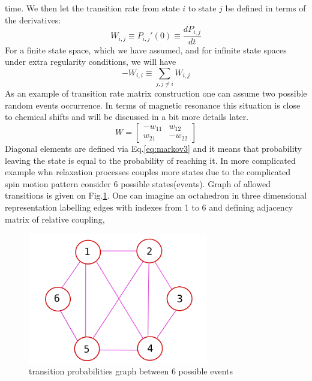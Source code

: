 time. We then let the transition rate from state $i$ to state $j$ be defined in terms of the derivatives:
\begin{equation}\label{eq:markov3}
W_{i,j}\equiv P_{i,j}'(0)\equiv \frac{dP_{i,j}}{dt}
\end{equation} 
For a finite state space, which we have assumed, and for infinite state spaces under extra regularity conditions, we will have
\begin{equation}\label{eq:markov3}
-W_{i,i}\equiv\sum_{j,j\neq i}W_{i,j}
\end{equation} 
As an example of transition rate matrix construction one can assume two possible random events occurrence. In terms of magnetic resonance this situation is close to chemical shifts and will be discussed in a bit more details later.  
\begin{equation}\label{eq:55}
W = \begin{bmatrix}
       -w_{11} & w_{12}  \\[0.3em]
        w_{21} & -w_{22}  
     \end{bmatrix}
\end{equation}
Diagonal elements are defined via Eq.\ref{eq:markov3} and it means that probability leaving the state is equal to the probability of reaching it. In more complicated example whn relaxation processes couples more states due to the complicated spin motion pattern consider 6 possible states(events). Graph of allowed transitions is given on Fig.\ref{figure:wdiagramm}. One can imagine an octahedron in three dimensional representation labelling edges with indexes from 1 to 6 and defining adjacency matrix of relative coupling,    
\begin{figure}[h!]
\begin{center}
\includegraphics[width=0.7\textwidth]{figures/chap2/wdiagramm.png}
\caption{transition probabilities graph between 6 possible events}
\label{figure:wdiagramm}
\end{center}
\end{figure}
